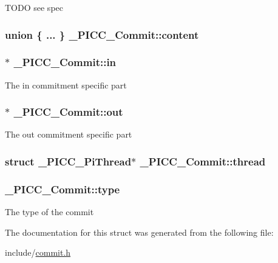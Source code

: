 T\-O\-D\-O see spec \hypertarget{struct__PICC__Commit_a64f32e0f5452a5abf31a90440b13be6e}{
\subsubsection[{content}]{\setlength{\rightskip}{0pt plus 5cm}union \{ ... \}   \-\_\-\-P\-I\-C\-C\-\_\-\-Commit\-::content}}\label{struct__PICC__Commit_a64f32e0f5452a5abf31a90440b13be6e}
\hypertarget{struct__PICC__Commit_a745a1a078043d4467bfa29ebf5d08a5b}{
\subsubsection[{in}]{$\ast$ \-\_\-\-P\-I\-C\-C\-\_\-\-Commit\-::in}}\label{struct__PICC__Commit_a745a1a078043d4467bfa29ebf5d08a5b}
The in commitment specific part \hypertarget{struct__PICC__Commit_a7ec6ea1ae1ab4b2b46da706874b4adda}{
\subsubsection[{out}]{$\ast$ \-\_\-\-P\-I\-C\-C\-\_\-\-Commit\-::out}}\label{struct__PICC__Commit_a7ec6ea1ae1ab4b2b46da706874b4adda}
The out commitment specific part \hypertarget{struct__PICC__Commit_a32fcb5ed4aa9281f5d9e6e64e6d65e36}{
\subsubsection[{thread}]{\setlength{\rightskip}{0pt plus 5cm}struct {\bf \-\_\-\-P\-I\-C\-C\-\_\-\-Pi\-Thread}$\ast$ \-\_\-\-P\-I\-C\-C\-\_\-\-Commit\-::thread}}\label{struct__PICC__Commit_a32fcb5ed4aa9281f5d9e6e64e6d65e36}
\hypertarget{struct__PICC__Commit_a3300308e83e1bd4843a73089906a25a9}{
\subsubsection[{type}]{ \-\_\-\-P\-I\-C\-C\-\_\-\-Commit\-::type}}\label{struct__PICC__Commit_a3300308e83e1bd4843a73089906a25a9}
The type of the commit 

The documentation for this struct was generated from the following file\-:\begin{DoxyCompactItemize}
\item 
include/\hyperlink{commit_8h}{commit.\-h}\end{DoxyCompactItemize}
